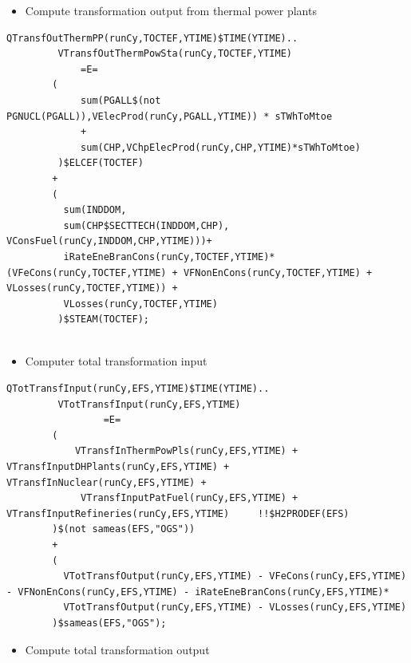 \documentclass[a4paper,]{scrartcl}
\providecommand{\tightlist}{%
  \setlength{\itemsep}{0pt}\setlength{\parskip}{0pt}}
\begin{document}
\begin{itemize}
\tightlist
\item
  Compute transformation output from thermal power plants
\end{itemize}

\begin{lstlisting}
QTransfOutThermPP(runCy,TOCTEF,YTIME)$TIME(YTIME)..
         VTransfOutThermPowSta(runCy,TOCTEF,YTIME)
             =E=
        (
             sum(PGALL$(not PGNUCL(PGALL)),VElecProd(runCy,PGALL,YTIME)) * sTWhToMtoe
             +
             sum(CHP,VChpElecProd(runCy,CHP,YTIME)*sTWhToMtoe)
         )$ELCEF(TOCTEF)
        +
        (                                                                                                         
          sum(INDDOM,
          sum(CHP$SECTTECH(INDDOM,CHP), VConsFuel(runCy,INDDOM,CHP,YTIME)))+
          iRateEneBranCons(runCy,TOCTEF,YTIME)*(VFeCons(runCy,TOCTEF,YTIME) + VFNonEnCons(runCy,TOCTEF,YTIME) + VLosses(runCy,TOCTEF,YTIME)) + 
          VLosses(runCy,TOCTEF,YTIME)                                                                                    
         )$STEAM(TOCTEF); 
            
\end{lstlisting}

\begin{itemize}
\tightlist
\item
  Computer total transformation input
\end{itemize}

\begin{lstlisting}
QTotTransfInput(runCy,EFS,YTIME)$TIME(YTIME)..
         VTotTransfInput(runCy,EFS,YTIME)
                 =E=
        (
            VTransfInThermPowPls(runCy,EFS,YTIME) + VTransfInputDHPlants(runCy,EFS,YTIME) + VTransfInNuclear(runCy,EFS,YTIME) +
             VTransfInputPatFuel(runCy,EFS,YTIME) + VTransfInputRefineries(runCy,EFS,YTIME)     !!$H2PRODEF(EFS)
        )$(not sameas(EFS,"OGS"))
        +
        (
          VTotTransfOutput(runCy,EFS,YTIME) - VFeCons(runCy,EFS,YTIME) - VFNonEnCons(runCy,EFS,YTIME) - iRateEneBranCons(runCy,EFS,YTIME)*
          VTotTransfOutput(runCy,EFS,YTIME) - VLosses(runCy,EFS,YTIME)
        )$sameas(EFS,"OGS");            
\end{lstlisting}

\begin{itemize}
\tightlist
\item
  Compute total transformation output
\end{itemize}
\end{document}
